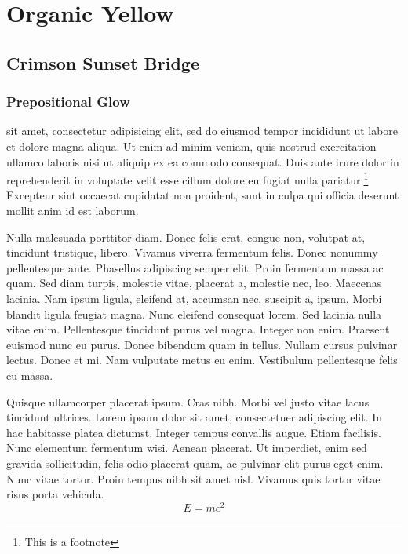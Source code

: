 \chapter{Organic Yellow}

\localtoc

\section{Crimson Sunset Bridge}

\subsection{Prepositional Glow}
 sit amet, consectetur adipisicing elit, sed do eiusmod
tempor incididunt ut labore et dolore magna aliqua. Ut enim ad minim veniam,
quis nostrud exercitation ullamco laboris nisi ut aliquip ex ea commodo
consequat. Duis aute irure dolor in reprehenderit in voluptate velit esse
cillum dolore eu fugiat nulla pariatur.\footnote{This is a footnote}
Excepteur sint occaecat cupidatat non proident, sunt in culpa qui officia deserunt
mollit anim id est laborum.

Nulla malesuada porttitor diam. Donec felis erat, congue non,
volutpat at, tincidunt tristique, libero. Vivamus viverra fermentum felis. Donec
nonummy pellentesque ante. Phasellus adipiscing semper elit. Proin fermentum
massa ac quam. Sed diam turpis, molestie vitae, placerat a, molestie nec, leo.
Maecenas lacinia. Nam ipsum ligula, eleifend at, accumsan nec, suscipit a,
ipsum. Morbi blandit ligula feugiat magna. Nunc eleifend consequat lorem.
Sed lacinia nulla vitae enim. Pellentesque tincidunt purus vel magna. Integer
non enim. Praesent euismod nunc eu purus. Donec bibendum quam in tellus.
Nullam cursus pulvinar lectus. Donec et mi. Nam vulputate metus eu enim.
Vestibulum pellentesque felis eu massa.

Quisque ullamcorper placerat ipsum. Cras nibh. Morbi vel justo vitae lacus
tincidunt ultrices. Lorem ipsum dolor sit amet, consectetuer adipiscing elit. In
hac habitasse platea dictumst. Integer tempus convallis augue. Etiam facilisis.
Nunc elementum fermentum wisi. Aenean placerat. Ut imperdiet, enim sed
gravida sollicitudin, felis odio placerat quam, ac pulvinar elit purus eget enim.
Nunc vitae tortor. Proin tempus nibh sit amet nisl. Vivamus quis tortor vitae
risus porta vehicula.
\begin{equation}
E = mc^2
\end{equation}

